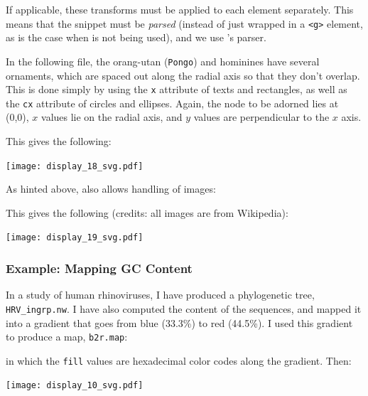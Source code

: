 If applicable, these transforms must be applied to each element separately.
This means that the \svg{} snippet must be \emph{parsed} (instead of just
wrapped in a \texttt{<g>} element, as is the case when \libxml{} is not being
used), and we use \libxml's \xml{} parser. 

In the following file, the orang-utan (\texttt{Pongo}) and hominines have
several ornaments, which are spaced out along the radial axis so that they don't
overlap. This is done simply by using the \texttt{x} attribute of texts and
rectangles, as well as the \texttt{cx} attribute of circles and ellipses. Again,
the node to be adorned lies at (0,0), $x$ values lie on the radial axis, and $y$
values are perpendicular to the $x$ axis.



This gives the following:


\begin{center}
\texttt{[image: display\_18\_svg.pdf]}
\end{center}

As hinted above, \libxml{} also allows handling of images:



This gives the following (credits: all images are from Wikipedia):


\begin{center}
\texttt{[image: display\_19\_svg.pdf]}
\end{center}

\subsubsection{Example: Mapping GC Content}
\label{sct_display_ornament_xpl_gc}

In a study of human rhinoviruses, I have produced a phylogenetic tree,
\texttt{HRV\_ingrp.nw}. I have also computed the \gc{} content of the sequences,
and mapped it into a gradient that goes from {\color{Blue} blue} (33.3\%) to
{\color{Red} red} (44.5\%). I used this gradient to produce a \css{} map,
\texttt{b2r.map}:




\noindent{}in which the \texttt{fill} values are hexadecimal color codes along
the gradient. Then:


\texttt{[image: display\_10\_svg.pdf]}
\bigskip{}

